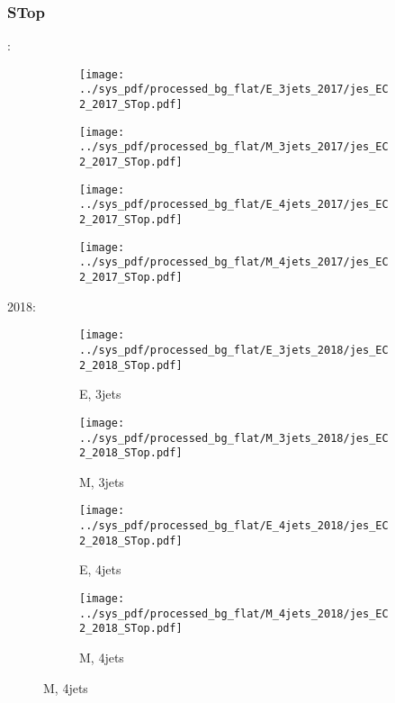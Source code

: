 \documentclass{beamer}
\begin{document}
\begin{frame}
\frametitle{STop}
\fontsize{5}{1}:
\begin{figure}
\centering
\begin{subfigure}[b]{0.24\textwidth}
\texttt{[image: ../sys\_pdf/processed\_bg\_flat/E\_3jets\_2017/jes\_EC2\_2017\_STop.pdf]}
\end{subfigure}
\begin{subfigure}[b]{0.24\textwidth}
\texttt{[image: ../sys\_pdf/processed\_bg\_flat/M\_3jets\_2017/jes\_EC2\_2017\_STop.pdf]}
\end{subfigure}
\begin{subfigure}[b]{0.24\textwidth}
\texttt{[image: ../sys\_pdf/processed\_bg\_flat/E\_4jets\_2017/jes\_EC2\_2017\_STop.pdf]}
\end{subfigure}
\begin{subfigure}[b]{0.24\textwidth}
\texttt{[image: ../sys\_pdf/processed\_bg\_flat/M\_4jets\_2017/jes\_EC2\_2017\_STop.pdf]}
\end{subfigure}
\end{figure}
2018:
\begin{figure}
\centering
\begin{subfigure}[b]{0.24\textwidth}
\texttt{[image: ../sys\_pdf/processed\_bg\_flat/E\_3jets\_2018/jes\_EC2\_2018\_STop.pdf]}
\captionsetup{font=tiny}
\caption{E, 3jets}
\end{subfigure}
\begin{subfigure}[b]{0.24\textwidth}
\texttt{[image: ../sys\_pdf/processed\_bg\_flat/M\_3jets\_2018/jes\_EC2\_2018\_STop.pdf]}
\captionsetup{font=tiny}
\caption{M, 3jets}
\end{subfigure}
\begin{subfigure}[b]{0.24\textwidth}
\texttt{[image: ../sys\_pdf/processed\_bg\_flat/E\_4jets\_2018/jes\_EC2\_2018\_STop.pdf]}
\captionsetup{font=tiny}
\caption{E, 4jets}
\end{subfigure}
\begin{subfigure}[b]{0.24\textwidth}
\texttt{[image: ../sys\_pdf/processed\_bg\_flat/M\_4jets\_2018/jes\_EC2\_2018\_STop.pdf]}
\captionsetup{font=tiny}
\caption{M, 4jets}
\end{subfigure}
\end{figure}
\end{frame}
\end{document}

